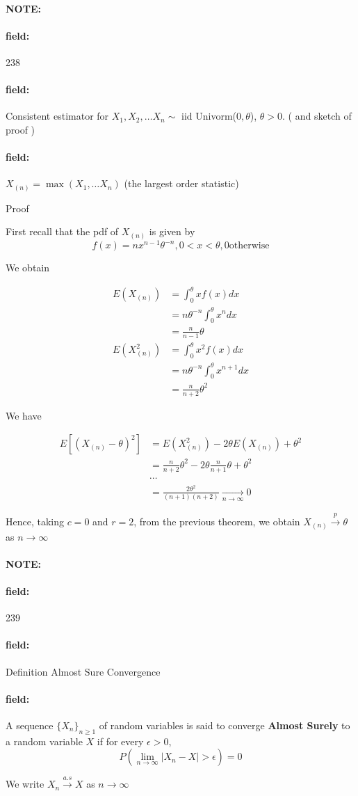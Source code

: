 \documentclass[12pt]{article}
\newenvironment{note}{\paragraph{NOTE:}}{}
\newenvironment{field}{\paragraph{field:}}{}
\begin{document}
\begin{note} \begin{field} \tiny 238 \end{field}
  \begin{field}
    Consistent estimator for $X_1, X_2, \ldots X_n \sim $ iid Univorm($0,\theta$), $\theta > 0$. ( and sketch of proof )
  \end{field}
  \begin{field}
    $X_{(n)} = \max(X_1, \ldots X_n)$ (the largest order statistic)

    Proof

    First recall that the pdf of $X_{(n)}$ is given by $$f(x) = nx^{n-1} \theta^{-n}, 0 < x < \theta, 0 \text{otherwise} $$

    We obtain

    \begin{align*}
      E(X_{(n)}) &= \int_{0}^\theta x f(x) dx \\
      &= n \theta^{-n} \int_0^\theta x^n dx \\
      &= \frac{n}{n-1}\theta\\
      E(X_{(n)}^2) &= \int_0^\theta x^2f(x)dx \\
      &= n\theta^{-n} \int_0^\theta x^{n+1}dx \\
      &= \frac{n}{n + 2} \theta^2
    \end{align*}

    We have

    \begin{align*}
      E[(X_{(n)} - \theta)^2] &= E(X_{(n)}^2) - 2\theta E(X_{(n)}) + \theta^2 \\
      &= \frac{n}{n + 2}\theta^2 - 2\theta \frac{n}{n + 1} \theta + \theta^2\\
      &\cdots\\
      &= \frac{2\theta^2}{(n + 1)(n + 2)} \underset{n \to \infty}{\to} 0
    \end{align*}

    Hence, taking $c = 0$ and $r = 2$, from the previous theorem, we obtain $X_{(n)} \overset{p}{\to} \theta$ as $n \to \infty$

  \end{field}
\end{note}



\begin{note} \begin{field} \tiny 239 \end{field}
  \begin{field}
    Definition Almost Sure Convergence
  \end{field}
  \begin{field}
    A sequence $\{X_n\}_{n \geq 1}$ of random variables is said to converge \textbf{Almost Surely} to a random variable $X$ if for every $\epsilon > 0$,
    $$ P(\lim_{n \to \infty}|X_n - X| > \epsilon) = 0$$

    We write $X_n \overset{a.s}{\to} X$ as $n \to \infty$

  \end{field}
\end{note}
\end{document}
